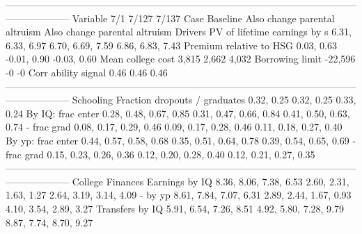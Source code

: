 --------------------------------------------------------------------------------------------------------------------------------
                              Variable                         7/1                          7/127                          7/137
                                  Case                    Baseline  Also change parental altruism  Also change parental altruism
                               Drivers                                                                                          
          PV of lifetime earnings by s            6.31, 6.33, 6.97               6.70, 6.69, 7.59               6.86, 6.83, 7.43
               Premium relative to HSG                  0.03, 0.63                    -0.01, 0.90                    -0.03, 0.60
                     Mean college cost                       3,815                          2,662                          4,032
                       Borrowing limit                     -22,596                             -0                             -0
                   Corr ability signal                        0.46                           0.46                           0.46
--------------------------------------------------------------------------------------------------------------------------------
                             Schooling                                                                                          
         Fraction dropouts / graduates                  0.32, 0.25                     0.32, 0.25                     0.33, 0.24
                     By IQ: frac enter      0.28, 0.48, 0.67, 0.85         0.31, 0.47, 0.66, 0.84         0.41, 0.50, 0.63, 0.74
                           - frac grad      0.08, 0.17, 0.29, 0.46         0.09, 0.17, 0.28, 0.46         0.11, 0.18, 0.27, 0.40
                     By yp: frac enter      0.44, 0.57, 0.58, 0.68         0.35, 0.51, 0.64, 0.78         0.39, 0.54, 0.65, 0.69
                           - frac grad      0.15, 0.23, 0.26, 0.36         0.12, 0.20, 0.28, 0.40         0.12, 0.21, 0.27, 0.35
--------------------------------------------------------------------------------------------------------------------------------
                      College Finances                                                                                          
                        Earnings by IQ      8.36, 8.06, 7.38, 6.53         2.60, 2.31, 1.63, 1.27         2.64, 3.19, 3.14, 4.09
                               - by yp      8.61, 7.84, 7.07, 6.31         2.89, 2.44, 1.67, 0.93         4.10, 3.54, 2.89, 3.27
                       Transfers by IQ      5.91, 6.54, 7.26, 8.51         4.92, 5.80, 7.28, 9.79         8.87, 7.74, 8.70, 9.27
